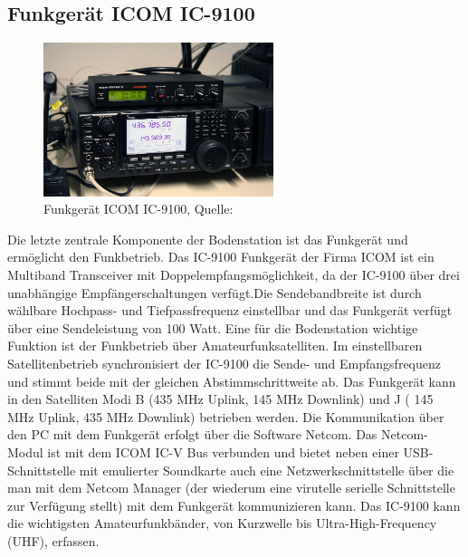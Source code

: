 \subsection{Funkgerät ICOM IC-9100}
\begin{figure}[h]
	\centering
	\includegraphics[width=0.6\textwidth]{images/radio}
	\caption{Funkgerät ICOM IC-9100, Quelle: \cite{dk0te}}
	\label{fig:radio}
\end{figure}
Die letzte zentrale Komponente der Bodenstation ist das Funkgerät und ermöglicht den Funkbetrieb. Das IC-9100 Funkgerät der Firma ICOM ist ein 
Multiband Transceiver mit Doppelempfangsmöglichkeit, da der IC-9100 über drei unabhängige Empfängerschaltungen verfügt.Die Sendebandbreite ist durch 
wählbare Hochpass- und Tiefpassfrequenz einstellbar und das Funkgerät verfügt über eine Sendeleistung von 100 Watt. Eine für die Bodenstation 
wichtige Funktion ist der Funkbetrieb über Amateurfunksatelliten. Im einstellbaren Satellitenbetrieb synchronisiert der IC-9100 die Sende-  und 
Empfangsfrequenz und stimmt beide mit der gleichen Abstimmschrittweite ab. Das Funkgerät kann in den Satelliten Modi B (435 MHz Uplink, 145 MHz 
Downlink) und J ( 145 MHz Uplink, 435 MHz Downlink) betrieben werden. Die Kommunikation über den PC mit dem Funkgerät erfolgt über die Software 
Netcom.  Das Netcom-Modul ist mit dem ICOM IC-V Bus verbunden und bietet neben einer USB-Schnittstelle mit emulierter 
Soundkarte auch eine Netzwerkschnittstelle über die man mit dem Netcom Manager (der wiederum eine virutelle serielle Schnittstelle zur Verfügung 
stellt) mit dem Funkgerät kommunizieren kann. Das IC-9100 kann die wichtigsten Amateurfunkbänder, von Kurzwelle bis Ultra-High-Frequency (UHF), 
erfassen. 





